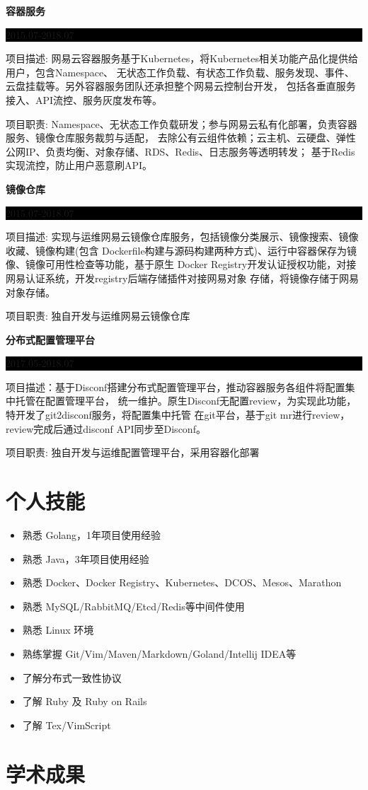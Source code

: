\documentclass[paper=a4,fontsize=11pt]{scrartcl} %
\newcommand{\sepspace}{\vspace*{1em}}		%
\newcommand{\Section}[1]{\section*{ #1 }}          %
\newcommand{\SubSection}[2]{
	\sepspace \noindent \textbf{#1} \hfill      %
	\colorbox{Black}{\parbox{7em}{\hfill\color{White}#2}} \par  %
	\normalsize \par \sepspace}
\begin{document}
\begin{CJK}{UTF8}{gbsn}
\SubSection{容器服务}{2015.07-2018.07}
项目描述: 网易云容器服务基于Kubernetes，将Kubernetes相关功能产品化提供给用户，包含Namespace、
无状态工作负载、有状态工作负载、服务发现、事件、云盘挂载等。另外容器服务团队还承担整个网易云控制台开发，
包括各垂直服务接入、API流控、服务灰度发布等。\par
\sepspace
项目职责: Namespace、无状态工作负载研发；参与网易云私有化部署，负责容器服务、镜像仓库服务裁剪与适配，
去除公有云组件依赖；云主机、云硬盘、弹性公网IP、负责均衡、对象存储、RDS、Redis、日志服务等透明转发；
基于Redis实现流控，防止用户恶意刷API。

\SubSection{镜像仓库}{2015.07-2018.07}
项目描述: 实现与运维网易云镜像仓库服务，包括镜像分类展示、镜像搜索、镜像收藏、镜像构建(包含
Dockerfile构建与源码构建两种方式)、运行中容器保存为镜像、镜像可用性检查等功能，基于原生
Docker Registry开发认证授权功能，对接网易认证系统，开发registry后端存储插件对接网易对象
存储，将镜像存储于网易对象存储。\par
\sepspace
项目职责: 独自开发与运维网易云镜像仓库

\SubSection{分布式配置管理平台}{2017.05-2018.07}
项目描述：基于Disconf搭建分布式配置管理平台，推动容器服务各组件将配置集中托管在配置管理平台，
统一维护。原生Disconf无配置review，为实现此功能，特开发了git2disconf服务，将配置集中托管
在git平台，基于git mr进行review，review完成后通过disconf API同步至Disconf。\par
\sepspace
项目职责: 独自开发与运维配置管理平台，采用容器化部署

\Section{个人技能}

\begin{itemize}
	\item 熟悉 Golang，1年项目使用经验
	\item 熟悉 Java，3年项目使用经验
	\item 熟悉 Docker、Docker Registry、Kubernetes、DCOS、Mesos、Marathon
	\item 熟悉 MySQL/RabbitMQ/Etcd/Redis等中间件使用
	\item 熟悉 Linux 环境
	\item 熟练掌握 Git/Vim/Maven/Markdown/Goland/Intellij IDEA等
	\item 了解分布式一致性协议
	\item 了解 Ruby 及 Ruby on Rails
	\item 了解 Tex/VimScript
\end{itemize}

\Section{学术成果}


\end{CJK}
\end{document}

